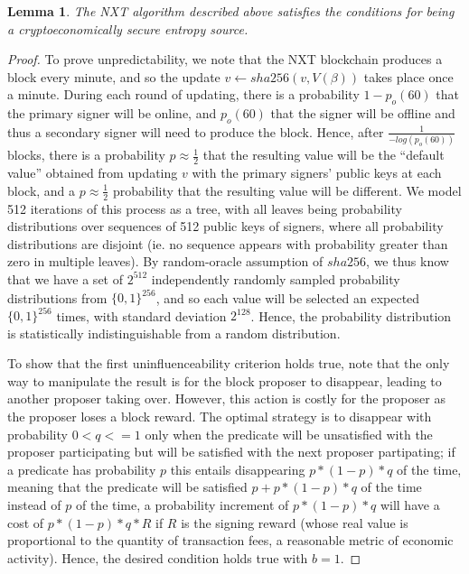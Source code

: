 \documentclass[11pt,a4paper]{report}
\theoremstyle{plain}
\newtheorem{lem}[thm]{Lemma}
\theoremstyle{definition}
\theoremstyle{remark}
\begin{document}
\begin{lem}
The NXT algorithm described above satisfies the conditions for being a cryptoeconomically secure entropy source.
\end{lem}
\begin{proof}
To prove unpredictability, we note that the NXT blockchain produces a block every minute, and so the update $v \leftarrow sha256(v, V(\beta))$ takes place once a minute. During each round of updating, there is a probability $1 - p_o(60)$ that the primary signer will be online, and $p_o(60)$ that the signer will be offline and thus a secondary signer will need to produce the block. Hence, after $\frac{1}{-log(p_o(60))}$ blocks, there is a probability $p \approx \frac{1}{2}$ that the resulting value will be the ``default value'' obtained from updating $v$ with the primary signers' public keys at each block, and a $p \approx \frac{1}{2}$ probability that the resulting value will be different. We model 512 iterations of this process as a tree, with all leaves being probability distributions over sequences of 512 public keys of signers, where all probability distributions are disjoint (ie. no sequence appears with probability greater than zero in multiple leaves). By random-oracle assumption of $sha256$, we thus know that we have a set of $2^{512}$ independently randomly sampled probability distributions from $\{0,1\}^{256}$, and so each value will be selected an expected $\{0,1\}^{256}$ times, with standard deviation $2^{128}$. Hence, the probability distribution is statistically indistinguishable from a random distribution.
 
To show that the first uninfluenceability criterion holds true, note that the only way to manipulate the result is for the block proposer to disappear, leading to another proposer taking over. However, this action is costly for the proposer as the proposer loses a block reward. The optimal strategy is to disappear with probability $0 < q <= 1$ only when the predicate will be unsatisfied with the proposer participating but will be satisfied with the next proposer partipating; if a predicate has probability $p$ this entails disappearing $p * (1-p) * q$ of the time, meaning that the predicate will be satisfied $p + p * (1-p) * q$ of the time instead of $p$ of the time, a probability increment of $p * (1-p) * q$ will have a cost of $p * (1-p) * q * R$ if $R$ is the signing reward (whose real value is proportional to the quantity of transaction fees, a reasonable metric of economic activity). Hence, the desired condition holds true with $b = 1$.


\end{proof}
\end{document}
